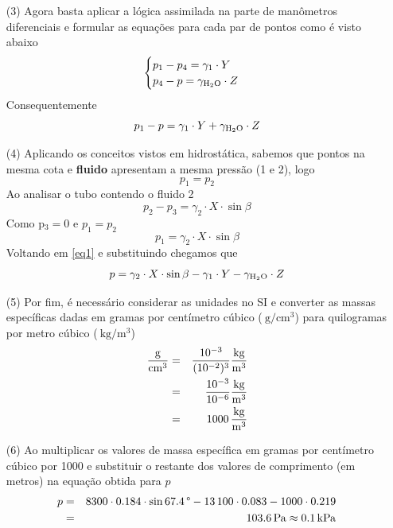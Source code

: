 \documentclass[
	a4paper,
	12pt,
	brazilian
]{article}
\begin{document}
\begin{enumerate}
\begin{center}
		\end{center}
		\item[(3)] Agora basta aplicar a lógica assimilada na parte de manômetros diferenciais e formular as equações para cada par de pontos como é visto abaixo
		$$
		\begin{cases}
			p_{1}-p_{4}=\gamma_{1}\cdot Y\\
			p_{4}-p=\gamma_{\ce{H2O}}\cdot Z
		\end{cases}
		$$
		Consequentemente
		\begin{equation}\label{eq1}
			p_{1}-p=\gamma_{1}\cdot Y+\gamma_{\ce{H2O}}\cdot Z
		\end{equation}
		\item[(4)] Aplicando os conceitos vistos em hidrostática, sabemos que pontos na mesma cota e \textbf{fluido} apresentam a mesma pressão (1 e 2), logo
		\begin{equation}
			p_{1}=p_{2}
		\end{equation}
		Ao analisar o tubo contendo o fluido 2
		\begin{equation}
			p_{2}-p_{3}=\gamma_{2}\cdot X\cdot\sin\beta
		\end{equation}
		Como p$_{3}=0$ e $p_{1}=p_{2}$
		\begin{equation}
			p_{1}=\gamma_{2}\cdot X\cdot\sin\beta
		\end{equation}
		Voltando em \eqref{eq1} e substituindo chegamos que
		\begin{equation}
			p=\gamma_{2}\cdot X\cdot\sin\beta-\gamma_{1}\cdot Y-\gamma_{\ce{H2O}}\cdot Z
		\end{equation}
		\item[(5)] Por fim, é necessário considerar as unidades no SI e converter as massas específicas dadas em gramas por centímetro cúbico ($\SI{}{\gram/\centi\meter^{3}}$) para quilogramas por metro cúbico ($\SI{}{\kilogram/\meter^{3}}$)
		\begin{eqnarray}
			\SI{}{\dfrac{\gram}{\centi\meter^{3}}}&=&\dfrac{10^{-3}}{(10^{-2})^{3}}\SI{}{\dfrac{\kilogram}{\meter^{3}}}\\
			&=&\dfrac{10^{-3}}{10^{-6}}\SI{}{\dfrac{\kilogram}{\meter^{3}}}\\
			&=&\SI{1000}{\dfrac{\kilogram}{\meter^{3}}}
		\end{eqnarray}
		\item[(6)] Ao multiplicar os valores de massa específica em gramas por centímetro cúbico por 1000 e substituir o restante dos valores de comprimento (em metros) na equação obtida para $p$
		\begin{eqnarray}
			p&=&8300\cdot 0.184\cdot\sin\SI{67.4}{\SIUnitSymbolDegree}-13\,100\cdot 0.083-1000\cdot 0.219\\
			&=&\SI{103.6}{\pascal}\approx\SI{0.1}{\kilo\pascal}
		\end{eqnarray}
	\end{enumerate}
\end{document}
